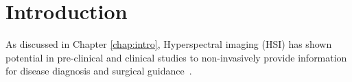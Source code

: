 

\section{Introduction}
\label{intro}
As discussed in Chapter \ref{chap:intro}, Hyperspectral imaging (HSI) has shown potential in pre-clinical and clinical studies to non-invasively provide information for disease diagnosis and surgical guidance~\citep{Lu2014,Giannoni2018,Calin2014,Shapey2019}. 

